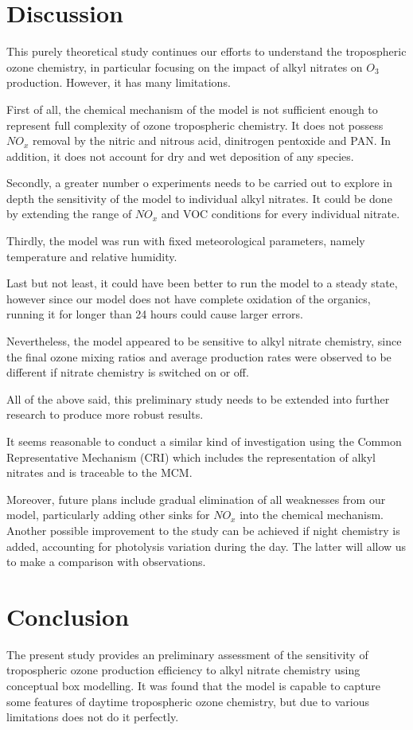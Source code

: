 \documentclass[11pt,a4paper]{article}
\begin{document}
\section{Discussion} \label{sec:discuss}
This purely theoretical study continues our efforts to understand the tropospheric ozone chemistry, in particular focusing on the impact of alkyl nitrates on $O_3$ production. However, it has many limitations.

First of all, the chemical mechanism of the model is not sufficient enough to represent full complexity of ozone tropospheric chemistry. It does not possess $NO_x$ removal by the nitric and nitrous acid, dinitrogen pentoxide and PAN. In addition, it does not account for dry and wet deposition of any species.

Secondly, a greater number o experiments needs to be carried out to explore in depth the sensitivity of the model to individual alkyl nitrates. It could be done by extending the range of $NO_x$ and VOC conditions for every individual nitrate.

Thirdly, the model was run with fixed meteorological parameters, namely temperature and relative humidity.

Last but not least, it could have been better to run the model to a steady state, however since our model does not have complete oxidation of the organics, running it for longer than 24 hours could cause larger errors.

Nevertheless, the model appeared to be sensitive to alkyl nitrate chemistry, since the final ozone mixing ratios and average production rates were observed to be different if nitrate chemistry is switched on or off. 

All of the above said, this preliminary study needs to be extended into further research to produce more robust results.

It seems reasonable to conduct a similar kind of investigation using the Common Representative Mechanism (CRI) which includes the representation of alkyl nitrates and is traceable to the MCM.

Moreover, future plans include gradual elimination of all weaknesses from our model, particularly adding other sinks for $NO_x$ into the chemical mechanism. Another possible improvement to the study can be achieved if night chemistry is added, accounting for photolysis variation during the day. The latter will allow us to make a comparison with observations.

\section{Conclusion} \label{sec:conclusion}
The present study provides an preliminary assessment of the sensitivity of tropospheric ozone production efficiency to alkyl nitrate chemistry using conceptual box modelling. It was found that the model is capable to capture some features of daytime tropospheric ozone chemistry, but due to various limitations does not do it perfectly.
\end{document}
